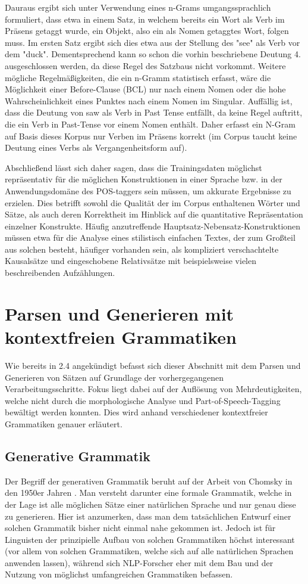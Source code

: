 \documentclass[12pt]{report}
\begin{document}
Dauraus ergibt sich unter Verwendung eines n-Grams umgangssprachlich formuliert, dass etwa in einem Satz, in welchem bereits ein Wort als Verb im Präsens getaggt wurde, ein Objekt, also ein als Nomen getaggtes Wort, folgen muss. Im ersten Satz ergibt sich dies etwa aus der Stellung des "see" als Verb vor dem "duck". Dementsprechend kann so schon die vorhin beschriebene Deutung 4. ausgeschlossen werden, da diese Regel des Satzbaus nicht vorkommt. Weitere mögliche Regelmäßigkeiten, die ein n-Gramm statistisch erfasst, wäre die Möglichkeit einer Before-Clause (BCL) nur nach einem Nomen oder die hohe Wahrscheinlichkeit eines Punktes nach einem Nomen im Singular. Auffällig ist, dass die Deutung von saw als Verb in Past Tense entfällt, da keine Regel auftritt, die ein Verb in Past-Tense vor einem Nomen enthält. Daher erfasst ein N-Gram auf Basis dieses Korpus nur Verben im Präsens korrekt (im Corpus taucht keine Deutung eines Verbs als Vergangenheitsform auf). 

Abschließend lässt sich daher sagen, dass die Trainingsdaten möglichst repräsentativ für die möglichen Konstruktionen in einer Sprache bzw. in der Anwendungsdomäne des POS-taggers sein müssen, um akkurate Ergebnisse zu erzielen. Dies betrifft sowohl die Qualität der im Corpus enthaltenen Wörter und Sätze, als auch deren Korrektheit im Hinblick auf die quantitative Repräsentation einzelner Konstrukte. Häufig anzutreffende Hauptsatz-Nebensatz-Konstruktionen müssen etwa für die Analyse eines stilistisch einfachen Textes, der zum Großteil aus solchen besteht, häufiger vorhanden sein, als kompliziert verschachtelte Kausalsätze und eingeschobene Relativsätze mit beispielsweise vielen beschreibenden Aufzählungen.  

\section{Parsen und Generieren mit kontextfreien Grammatiken}
Wie bereits in 2.4 angekündigt befasst sich dieser Abschnitt mit dem Parsen und Generieren von Sätzen auf Grundlage der vorhergegangenen Verarbeitungsschritte. Fokus liegt dabei auf der Auflösung von Mehrdeutigkeiten, welche nicht durch die morphologische Analyse und Part-of-Speech-Tagging bewältigt werden konnten. Dies wird anhand verschiedener kontextfreier Grammatiken genauer erläutert. 

\subsection{Generative Grammatik}
Der Begriff der generativen Grammatik beruht auf der Arbeit von Chomsky in den 1950er Jahren \cite{cho57}. Man versteht darunter eine formale Grammatik, welche in der Lage ist alle möglichen Sätze einer natürlichen Sprache und nur genau diese zu generieren. Hier ist anzumerken, dass man dem tatsächlichen Entwurf einer solchen Grammatik bisher nicht einmal nahe gekommen ist. Jedoch ist für Linguisten der prinzipielle Aufbau von solchen Grammatiken höchst interessant (vor allem von solchen Grammatiken, welche sich auf alle natürlichen Sprachen anwenden lassen), während sich NLP-Forscher eher mit dem Bau und der Nutzung von möglichst umfangreichen Grammatiken befassen. 
\end{document}
